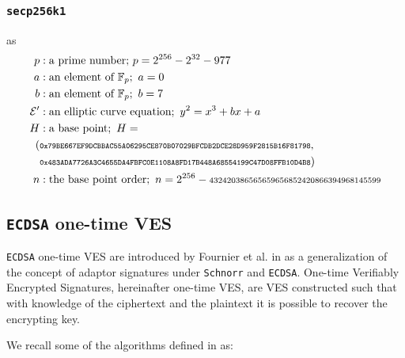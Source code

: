 \documentclass{llncs}
\begin{document}
\subsubsection{\texttt{secp256k1}} as
\begin{equation}
\begin{split}
    p&: \text{a prime number;}\ p = 2^{256} - 2^{32} - 977 \\
    a&: \text{an element of } \mathbb{F}_p;\ a = 0 \\
    b&: \text{an element of } \mathbb{F}_p;\ b = 7 \\
    \mathcal{E}'&: \text{an elliptic curve equation};\ y^2 = x^3 + bx + a \\
    H&: \text{a base point};\ H = \\ (&\texttt{\scriptsize0x79BE667EF9DCBBAC55A06295CE870B07029BFCDB2DCE28D959F2815B16F81798},\\ &\texttt{\scriptsize0x483ADA7726A3C4655DA4FBFC0E1108A8FD17B448A68554199C47D08FFB10D4B8}) \\
    n&: \text{the base point order};\ n = 2^{256} - \text{\scriptsize{432420386565659656852420866394968145599}} \\
\end{split}
\end{equation}

\subsection{\texttt{ECDSA} one-time VES}
\label{oneTimeEcdsaVES}
\texttt{ECDSA} one-time VES are introduced by Fournier et al. in \cite{oneTimeVES} as a generalization of the concept of adaptor signatures under \texttt{Schnorr} and \texttt{ECDSA}. One-time Verifiably Encrypted Signatures, hereinafter one-time VES, are VES constructed such that with knowledge of the ciphertext and the plaintext it is possible to recover the encrypting key.

We recall some of the algorithms defined in \cite{oneTimeVES} as:
\end{document}
